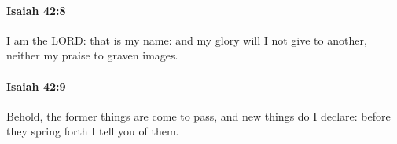		\paragraph{Isaiah 42:8} %
			\label{ISAIAH-42-8}

			I am the LORD: that is my name: and my glory will I not give to another, neither my praise to graven images.


		\paragraph{Isaiah 42:9} %
			\label{ISAIAH-42-9}

			Behold, the former things are come to pass, and new things do I declare: before they spring forth I tell you of them.



